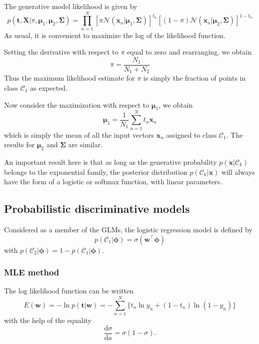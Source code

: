 \documentclass[a4paper]{report}
\newcommand{\ud}{\mathrm{d}}
\renewcommand{\bf}{\mathbf}
\renewcommand{\cal}{\mathcal}
\newcommand{\bs}{\boldsymbol}
\begin{document}
The generative model likelihood is given by
\begin{equation}
	p(\bf{t,X}|\pi,\bs{\mu}_1,\bs{\mu}_2,\bs{\Sigma}) = \prod_{n=1}^N [\pi \cal{N}(\bf{x}_n|\bs{\mu}_1,\bs{\Sigma})]^{t_n}[(1-\pi)\cal{N}(\bf{x}_n|\bs{\mu}_2,\bs{\Sigma})]^{1-t_n}
\end{equation}
As usual, it is convenient to maximize the log of the likelihood function.

Setting the derivative with respect to $\pi$ equal to zero and rearranging, we obtain
\begin{equation}
	\pi = \frac{N_1}{N_1+N_2}
\end{equation}
Thus the maximum likelihood estimate for $\pi$ is simply the fraction of points in class $\cal{C}_1$ as expected.

Now consider the maximization with respect to $\bs{\mu}_1$, we obtain
\begin{equation}
	\bs{\mu}_1 = \frac{1}{N_1} \sum_{n=1}^N t_n \bf{x}_n
\end{equation}
which is simply the mean of all the input vectors $\bf{x}_n$ assigned to class $\cal{C}_1$. The results for $\bs{\mu}_2$ and $\bs{\Sigma}$ are similar. 

An important result here is that as long as the generative probability $p(\bf{x}|\cal{C}_k)$ belongs to the exponential family, the posterior distribution $p(\cal{C}_k|\bf{x})$ will always have the form of a logistic or softmax function, with linear parameters.
\subsection{Probabilistic discriminative models} \label{LC}
Considered as a member of the GLMs, the logistic regression model is defined by
\begin{equation}
	p(\cal{C}_1|\bs{\phi}) = \sigma(\bf{w}^{\intercal} \bs{\phi})
\end{equation}
with $p(\cal{C}_2|\bs{\phi}) = 1-p(\cal{C}_1|\bs{\phi})$.

\subsubsection{MLE method}
The log likelihood function can be written
\begin{equation}
	E(\bf{w}) = -\ln p(\bf{t|w}) = -\sum_{n=1}^N \{ t_n \ln y_n + (1-t_n) \ln (1-y_n) \}
\end{equation}
with the help of the equality
\begin{equation}
	\frac{\ud \sigma}{\ud a} = \sigma (1-\sigma).
\end{equation}
\end{document}
